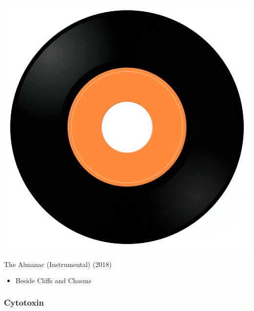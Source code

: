 \begin{minipage}[t]{0.25\textwidth}\vspace{0pt}
\captionsetup{type=figure}
\includegraphics[width=\textwidth]{Images/cover.png}
\caption*{The Almanac (Instrumental) (2018)}
\end{minipage}
\begin{minipage}[t]{0.25\textwidth}\vspace{0pt}
\begin{itemize}[nosep,leftmargin=1em,labelwidth=*,align=left]
	\setlength{\itemsep}{0pt}
	\item Beside Cliffs and Chasms 
\end{itemize}
\end{minipage}

\subsubsection{Cytotoxin}

